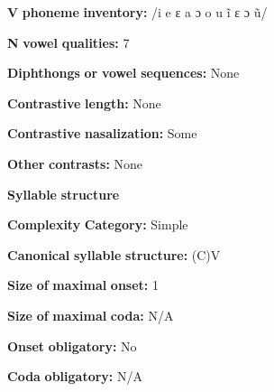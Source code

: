 \begin{styleBody}
\textbf{V} \textbf{phoneme} \textbf{inventory:} /i e ɛ a ɔ o u ĩ ɛ ɔ ũ/
\end{styleBody}

\begin{styleBody}
\textbf{N} \textbf{vowel} \textbf{qualities:} 7
\end{styleBody}

\begin{styleBody}
\textbf{Diphthongs} \textbf{or} \textbf{vowel} \textbf{sequences:} None
\end{styleBody}

\begin{styleBody}
\textbf{Contrastive} \textbf{length:} None
\end{styleBody}

\begin{styleBody}
\textbf{Contrastive} \textbf{nasalization:} Some
\end{styleBody}

\begin{styleBody}
\textbf{Other} \textbf{contrasts:} None
\end{styleBody}

\begin{styleBody}
\textbf{Syllable} \textbf{structure}
\end{styleBody}

\begin{styleBody}
\textbf{Complexity} \textbf{Category:} Simple
\end{styleBody}

\begin{styleBody}
\textbf{Canonical} \textbf{syllable} \textbf{structure:} (C)V \citep[6]{Bamgbose1966}
\end{styleBody}

\begin{styleBody}
\textbf{Size} \textbf{of} \textbf{maximal} \textbf{onset:} 1
\end{styleBody}

\begin{styleBody}
\textbf{Size} \textbf{of} \textbf{maximal} \textbf{coda:} N/A
\end{styleBody}

\begin{styleBody}
\textbf{Onset} \textbf{obligatory:} No
\end{styleBody}

\begin{styleBody}
\textbf{Coda} \textbf{obligatory:} N/A
\end{styleBody}


